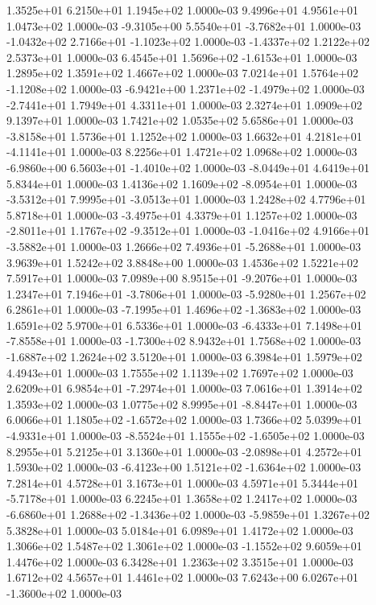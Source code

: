 1.3525e+01 6.2150e+01 1.1945e+02  1.0000e-03
9.4996e+01 4.9561e+01 1.0473e+02  1.0000e-03
-9.3105e+00  5.5540e+01 -3.7682e+01  1.0000e-03
-1.0432e+02  2.7166e+01 -1.1023e+02  1.0000e-03
-1.4337e+02  1.2122e+02  2.5373e+01  1.0000e-03
 6.4545e+01  1.5696e+02 -1.6153e+01  1.0000e-03
1.2895e+02 1.3591e+02 1.4667e+02  1.0000e-03
 7.0214e+01  1.5764e+02 -1.1208e+02  1.0000e-03
-6.9421e+00  1.2371e+02 -1.4979e+02  1.0000e-03
-2.7441e+01  1.7949e+01  4.3311e+01  1.0000e-03
2.3274e+01 1.0909e+02 9.1397e+01  1.0000e-03
1.7421e+02 1.0535e+02 5.6586e+01  1.0000e-03
-3.8158e+01  1.5736e+01  1.1252e+02  1.0000e-03
 1.6632e+01  4.2181e+01 -4.1141e+01  1.0000e-03
8.2256e+01 1.4721e+02 1.0968e+02  1.0000e-03
-6.9860e+00  6.5603e+01 -1.4010e+02  1.0000e-03
-8.0449e+01  4.6419e+01  5.8344e+01  1.0000e-03
 1.4136e+02  1.1609e+02 -8.0954e+01  1.0000e-03
-3.5312e+01  7.9995e+01 -3.0513e+01  1.0000e-03
1.2428e+02 4.7796e+01 5.8718e+01  1.0000e-03
-3.4975e+01  4.3379e+01  1.1257e+02  1.0000e-03
-2.8011e+01  1.1767e+02 -9.3512e+01  1.0000e-03
-1.0416e+02  4.9166e+01 -3.5882e+01  1.0000e-03
 1.2666e+02  7.4936e+01 -5.2688e+01  1.0000e-03
3.9639e+01 1.5242e+02 3.8848e+00  1.0000e-03
1.4536e+02 1.5221e+02 7.5917e+01  1.0000e-03
 7.0989e+00  8.9515e+01 -9.2076e+01  1.0000e-03
 1.2347e+01  7.1946e+01 -3.7806e+01  1.0000e-03
-5.9280e+01  1.2567e+02  6.2861e+01  1.0000e-03
-7.1995e+01  1.4696e+02 -1.3683e+02  1.0000e-03
1.6591e+02 5.9700e+01 6.5336e+01  1.0000e-03
-6.4333e+01  7.1498e+01 -7.8558e+01  1.0000e-03
-1.7300e+02  8.9432e+01  1.7568e+02  1.0000e-03
-1.6887e+02  1.2624e+02  3.5120e+01  1.0000e-03
6.3984e+01 1.5979e+02 4.4943e+01  1.0000e-03
1.7555e+02 1.1139e+02 1.7697e+02  1.0000e-03
 2.6209e+01  6.9854e+01 -7.2974e+01  1.0000e-03
7.0616e+01 1.3914e+02 1.3593e+02  1.0000e-03
 1.0775e+02  8.9995e+01 -8.8447e+01  1.0000e-03
 6.0066e+01  1.1805e+02 -1.6572e+02  1.0000e-03
 1.7366e+02  5.0399e+01 -4.9331e+01  1.0000e-03
-8.5524e+01  1.1555e+02 -1.6505e+02  1.0000e-03
8.2955e+01 5.2125e+01 3.1360e+01  1.0000e-03
-2.0898e+01  4.2572e+01  1.5930e+02  1.0000e-03
-6.4123e+00  1.5121e+02 -1.6364e+02  1.0000e-03
7.2814e+01 4.5728e+01 3.1673e+01  1.0000e-03
 4.5971e+01  5.3444e+01 -5.7178e+01  1.0000e-03
6.2245e+01 1.3658e+02 1.2417e+02  1.0000e-03
-6.6860e+01  1.2688e+02 -1.3436e+02  1.0000e-03
-5.9859e+01  1.3267e+02  5.3828e+01  1.0000e-03
5.0184e+01 6.0989e+01 1.4172e+02  1.0000e-03
1.3066e+02 1.5487e+02 1.3061e+02  1.0000e-03
-1.1552e+02  9.6059e+01  1.4476e+02  1.0000e-03
6.3428e+01 1.2363e+02 3.3515e+01  1.0000e-03
1.6712e+02 4.5657e+01 1.4461e+02  1.0000e-03
 7.6243e+00  6.0267e+01 -1.3600e+02  1.0000e-03
